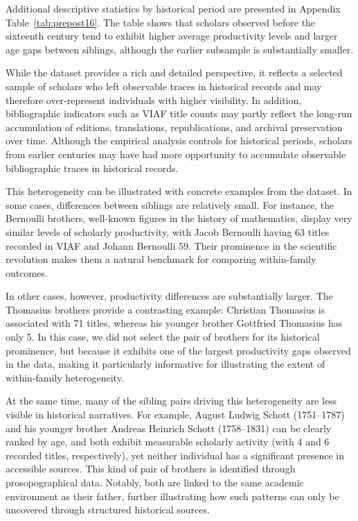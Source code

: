 Additional descriptive statistics by historical period are presented in Appendix Table~\ref{tab:prepost16}. The table shows that scholars observed before the sixteenth century tend to exhibit higher average productivity levels and larger age gaps between siblings, although the earlier subsample is substantially smaller. 

While the dataset provides a rich and detailed perspective, it reflects a selected sample of scholars who left observable traces in historical records and may therefore over-represent individuals with higher visibility. In addition, bibliographic indicators such as VIAF title counts may partly reflect the long-run accumulation of editions, translations, republications, and archival preservation over time. Although the empirical analysis controls for historical periods, scholars from earlier centuries may have had more opportunity to accumulate observable bibliographic traces in historical records.

This heterogeneity can be illustrated with concrete examples from the dataset. In some cases, differences between siblings are relatively small. For instance, the Bernoulli brothers, well-known figures in the history of mathematics, display very similar levels of scholarly productivity, with Jacob Bernoulli having 63 titles recorded in VIAF and Johann Bernoulli 59. Their prominence in the scientific revolution makes them a natural benchmark for comparing within-family outcomes.

In other cases, however, productivity differences are substantially larger. The Thomasius brothers provide a contrasting example: Christian Thomasius is associated with 71 titles, whereas his younger brother Gottfried Thomasius has only 5. In this case, we did not select the pair of brothers for its historical prominence, but because it exhibits one of the largest productivity gaps observed in the data, making it particularly informative for illustrating the extent of within-family heterogeneity.

At the same time, many of the sibling pairs driving this heterogeneity are less visible in historical narratives. For example, August Ludwig Schott (1751–1787) and his younger brother Andreas Heinrich Schott (1758–1831) can be clearly ranked by age, and both exhibit measurable scholarly activity (with 4 and 6 recorded titles, respectively), yet neither individual has a significant presence in accessible sources. This kind of pair of brothers is identified through prosopographical data. Notably, both are linked to the same academic environment as their father, further illustrating how such patterns can only be uncovered through structured historical sources.

